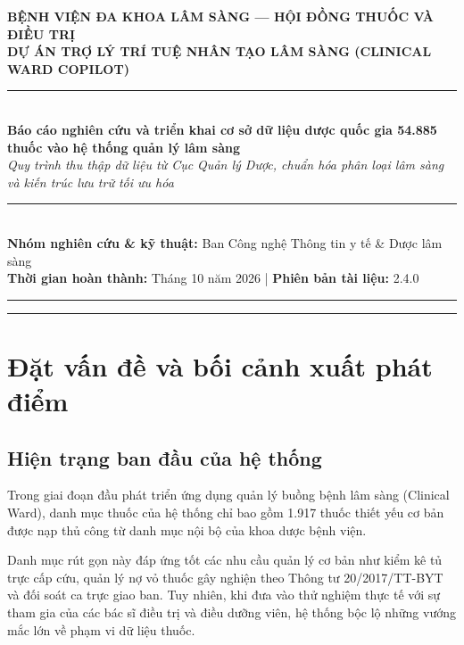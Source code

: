 \documentclass[12pt,a4paper]{article}
\begin{document}
\begin{center}
    {\large \textbf{BỆNH VIỆN ĐA KHOA LÂM SÀNG --- HỘI ĐỒNG THUỐC VÀ ĐIỀU TRỊ}}\\[0.2cm]
    {\normalsize \textbf{DỰ ÁN TRỢ LÝ TRÍ TUỆ NHÂN TẠO LÂM SÀNG (CLINICAL WARD COPILOT)}}\\[0.5cm]
    \rule{\textwidth}{1.2pt}\\[0.4cm]
    {\LARGE \textbf{Báo cáo nghiên cứu và triển khai cơ sở dữ liệu dược quốc gia 54.885 thuốc vào hệ thống quản lý lâm sàng}}\\[0.3cm]
    {\normalsize \textit{Quy trình thu thập dữ liệu từ Cục Quản lý Dược, chuẩn hóa phân loại lâm sàng và kiến trúc lưu trữ tối ưu hóa}}\\[0.3cm]
    \rule{\textwidth}{0.6pt}\\[0.4cm]
    {\small \textbf{Nhóm nghiên cứu \& kỹ thuật:} Ban Công nghệ Thông tin y tế \& Dược lâm sàng}\\
    {\small \textbf{Thời gian hoàn thành:} Tháng 10 năm 2026 \quad | \quad \textbf{Phiên bản tài liệu:} 2.4.0}
\end{center}

\vspace{0.3cm}
\rule{\textwidth}{0.4pt}
\vspace{0.2cm}

\tableofcontents

\vspace{0.4cm}
\rule{\textwidth}{0.4pt}
\newpage

\section{Đặt vấn đề và bối cảnh xuất phát điểm}

\subsection{Hiện trạng ban đầu của hệ thống}
Trong giai đoạn đầu phát triển ứng dụng quản lý buồng bệnh lâm sàng (Clinical Ward), danh mục thuốc của hệ thống chỉ bao gồm 1.917 thuốc thiết yếu cơ bản được nạp thủ công từ danh mục nội bộ của khoa dược bệnh viện. 

Danh mục rút gọn này đáp ứng tốt các nhu cầu quản lý cơ bản như kiểm kê tủ trực cấp cứu, quản lý nợ vỏ thuốc gây nghiện theo Thông tư 20/2017/TT-BYT và đối soát ca trực giao ban. Tuy nhiên, khi đưa vào thử nghiệm thực tế với sự tham gia của các bác sĩ điều trị và điều dưỡng viên, hệ thống bộc lộ những vướng mắc lớn về phạm vi dữ liệu thuốc.
\end{document}
